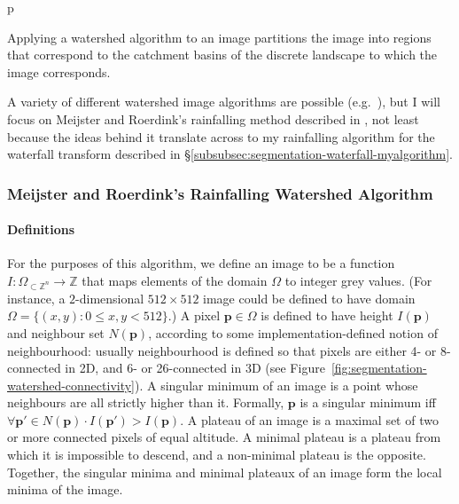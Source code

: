 \begin{stusubfig}{p}
\caption{Applying a watershed algorithm to an image partitions the image into regions that correspond to the catchment basins of the discrete landscape to which the image corresponds.}
\label{fig:segmentation-watershed-regionbasincorrespondence}
\end{stusubfig}

A variety of different watershed image algorithms are possible (e.g.~\cite{bieniek00,meijster98,osma-ruiz06,rambabu07,stoev00}), but I will focus on Meijster and Roerdink's rainfalling method described in \cite{meijster98}, not least because the ideas behind it translate across to my rainfalling algorithm for the waterfall transform described in \S\ref{subsubsec:segmentation-waterfall-myalgorithm}.

\subsubsection{Meijster and Roerdink's Rainfalling Watershed Algorithm}

\paragraph{Definitions}

For the purposes of this algorithm, we define an image to be a function $I: \Omega_{\subset \mathbb{Z}^n} \to \mathbb{Z}$ that maps elements of the domain $\Omega$ to integer grey values. (For instance, a $2$-dimensional $512 \times 512$ image could be defined to have domain $\Omega = \{(x,y) : 0 \le x,y < 512\}$.) A pixel $\mathbf{p} \in \Omega$ is defined to have height $I(\mathbf{p})$ and neighbour set $N(\mathbf{p})$, according to some implementation-defined notion of neighbourhood: usually neighbourhood is defined so that pixels are either 4- or 8-connected in 2D, and 6- or 26-connected in 3D (see Figure~\ref{fig:segmentation-watershed-connectivity}). A singular minimum of an image is a point whose neighbours are all strictly higher than it. Formally, $\mathbf{p}$ is a singular minimum iff $\forall \mathbf{p'} \in N(\mathbf{p}) \cdot I(\mathbf{p'}) > I(\mathbf{p})$. A plateau of an image is a maximal set of two or more connected pixels of equal altitude. A minimal plateau is a plateau from which it is impossible to descend, and a non-minimal plateau is the opposite. Together, the singular minima and minimal plateaux of an image form the local minima of the image.

